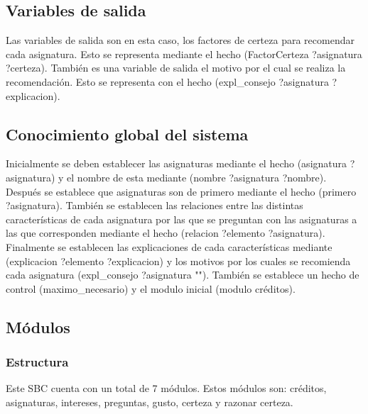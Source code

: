\subsection{Variables de salida}
Las variables de salida son en esta caso, los factores de certeza para recomendar cada asignatura. Esto se representa mediante el hecho (FactorCerteza ?asignatura ?certeza). También es una variable de salida el motivo por el cual se realiza la recomendación. Esto se representa con el hecho (expl\_consejo ?asignatura ?explicacion).
\subsection{Conocimiento global del sistema}
Inicialmente se deben establecer las asignaturas mediante el hecho (asignatura ?asignatura) y el nombre de esta mediante (nombre ?asignatura ?nombre). Después se establece que asignaturas son de primero mediante el hecho (primero ?asignatura). También se establecen las relaciones entre las distintas características de cada asignatura por las que se preguntan con las asignaturas a las que corresponden mediante el hecho (relacion ?elemento ?asignatura). Finalmente se establecen las explicaciones de cada características mediante (explicacion ?elemento ?explicacion) y los motivos por los cuales se recomienda cada asignatura (expl\_consejo ?asignatura ""). También se establece un hecho de control (maximo_necesario) y el modulo inicial (modulo créditos).
\subsection{Módulos}
\subsubsection{Estructura}
Este SBC cuenta con un total de 7 módulos. Estos módulos son: créditos, asignaturas, intereses, preguntas, gusto, certeza y razonar certeza.
